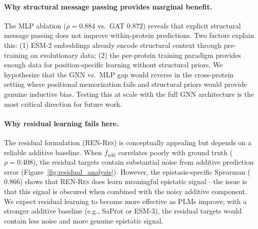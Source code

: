 \documentclass{article}
\newcommand{\renr}{\textsc{REN-Res}}
\newcommand{\spearman}{\rho}
\begin{document}
\paragraph{Why structural message passing provides marginal benefit.}
The MLP ablation ($\spearman = 0.884$ vs.\ GAT $0.872$) reveals that explicit structural message passing does not improve within-protein predictions. Two factors explain this: (1) ESM-2 embeddings already encode structural context through pre-training on evolutionary data; (2) the per-protein training paradigm provides enough data for position-specific learning without structural priors. We hypothesize that the GNN vs.\ MLP gap would reverse in the cross-protein setting where positional memorization fails and structural priors would provide genuine inductive bias. Testing this at scale with the full GNN architecture is the most critical direction for future work.

\paragraph{Why residual learning fails here.}
The residual formulation (\renr{}) is conceptually appealing but depends on a reliable additive baseline. When $f_\text{add}$ correlates poorly with ground truth ($\spearman = 0.408$), the residual targets contain substantial noise from additive prediction error (Figure~\ref{fig:residual_analysis}). However, the epistasis-specific Spearman ($0.866$) shows that \renr{} does learn meaningful epistatic signal---the issue is that this signal is obscured when combined with the noisy additive component. We expect residual learning to become more effective as PLMs improve; with a stronger additive baseline (e.g., SaProt or ESM-3), the residual targets would contain less noise and more genuine epistatic signal.
\end{document}
